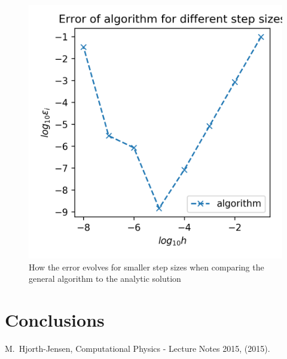 \documentclass[10pt,showpacs,preprintnumbers,footinbib,amsmath,amssymb,aps,prl,twocolumn,groupedaddress,superscriptaddress,showkeys]{revtex4-1}
\begin{document}
  \begin{figure}[hbtp]
    \center
    \includegraphics[scale=.7]{figs/ex1e_err.png}
    \caption{How the error evolves for smaller step sizes when comparing the general algorithm to the analytic solution}
  \end{figure}






\section{Conclusions}

\begin{thebibliography}{99}
 M.~Hjorth-Jensen, Computational Physics - Lecture Notes 2015, (2015).
\end{thebibliography}
\end{document}
